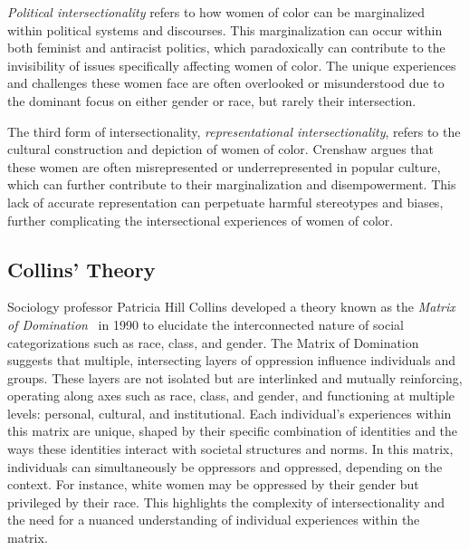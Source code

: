 
\emph{Political intersectionality} refers to how women of color can be marginalized within political systems and discourses. This marginalization can occur within both feminist and antiracist politics, which paradoxically can contribute to the invisibility of issues specifically affecting women of color. The unique experiences and challenges these women face are often overlooked or misunderstood due to the dominant focus on either gender or race, but rarely their intersection.


The third form of intersectionality, \emph{representational intersectionality}, refers to the cultural construction and depiction of women of color. Crenshaw argues that these women are often misrepresented or underrepresented in popular culture, which can further contribute to their marginalization and disempowerment. This lack of accurate representation can perpetuate harmful stereotypes and biases, further complicating the intersectional experiences of women of color.

\subsection{Collins' Theory}
\label{sec:int_coll}

Sociology professor Patricia Hill Collins developed a theory known as the \emph{Matrix of Domination}~\cite{collins1990} in 1990 to elucidate the interconnected nature of social categorizations such as race, class, and gender. 
%
The Matrix of Domination suggests that multiple, intersecting layers of oppression influence individuals and groups. These layers are not isolated but are interlinked and mutually reinforcing, operating along axes such as race, class, and gender, and functioning at multiple levels: personal, cultural, and institutional. Each individual's experiences within this matrix are unique, shaped by their specific combination of identities and the ways these identities interact with societal structures and norms.
%
In this matrix, individuals can simultaneously be oppressors and oppressed, depending on the context. For instance, white women may be oppressed by their gender but privileged by their race. This highlights the complexity of intersectionality and the need for a nuanced understanding of individual experiences within the matrix.

